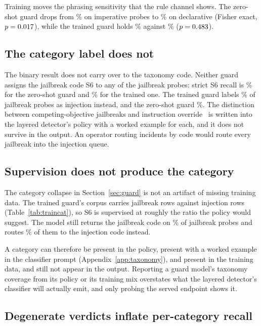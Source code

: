 \documentclass[conference]{IEEEtran}
\begin{document}
Training moves the phrasing sensitivity that the rule channel shows. The
zero-shot guard drops from \BinTprImpZs{}\% on imperative probes to
\BinTprDecZs{}\% on declarative (Fisher exact, $p=0.017{}$),
while the trained guard holds \BinTprDecTr{}\% against \BinTprImpTr{}\%
($p=0.483{}$).

\subsection{The category label does not}

The binary result does not carry over to the taxonomy code. Neither guard
assigns the jailbreak code S6 to any of the \NSsix{} jailbreak probes: strict
S6 recall is \CatTprSsixStrictZs{}\% for the zero-shot guard and
\CatTprSsixStrictTr{}\% for the trained one. The trained guard labels
\SsixAsSfiveTr{}\% of jailbreak probes as injection instead, and the zero-shot
guard \SsixAsSfiveZs{}\%. The distinction between competing-objective
jailbreaks and instruction override~\cite{wei2023jailbroken} is written into
the layered detector's policy with a worked example for each, and it does not survive in
the output. An operator routing incidents by code would route every jailbreak
into the injection queue.

\subsection{Supervision does not produce the category}\label{sec:s6gap}

The category collapse in Section~\ref{sec:guard} is not an artifact of missing
training data. The trained guard's corpus carries \NTrainSsixTr{} jailbreak
rows against \NTrainSfiveTr{} injection rows (Table~\ref{tab:traincat}), so
S6 is supervised at roughly the ratio the policy would suggest. The model still
returns the jailbreak code on \CatTprSsixStrictTr{}\% of jailbreak probes and
routes \SsixAsSfiveTr{}\% of them to the injection code instead.

A category can therefore be present in the policy, present with a worked
example in the classifier prompt (Appendix~\ref{app:taxonomy}), and present in
the training data, and still not appear in the output. Reporting a guard
model's taxonomy coverage from its policy or its training mix overstates what
the layered detector's classifier will actually emit, and only probing the served
endpoint shows it.

\subsection{Degenerate verdicts inflate per-category recall}
\end{document}
